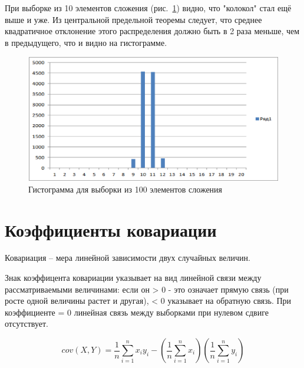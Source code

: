 \documentclass[a4paper,12pt]{article}
\begin{document}
\newpage
При выборке из 10 элементов сложения (рис.~\ref{fig:im_3}) видно, что "колокол" стал ещё выше и уже. Из центральной предельной теоремы следует, что среднее квадратичное отклонение этого распределения должно быть в 2 раза меньше, чем в предыдущего, что и видно на гистограмме.
\begin{center}
	\begin{figure}[h]
		\centering
   		\includegraphics[scale=0.3]{figure_3.png}
   		\caption{Гистограмма для выборки из 100 элементов сложения}
   		\label{fig:im_3}
    \end{figure}
\end{center}

\newpage\section{Коэффициенты ковариации}

Ковариация – мера линейной зависимости двух случайных величин.

Знак коэффицента ковариации указывает на вид линейной связи между рассматриваемыми величинами: если он > 0 - это означает прямую связь (при росте одной величины растет и другая), < 0 указывает на обратную связь. При коэффициенте = 0 линейная связь между выборками при нулевом сдвиге отсутствует.

{\large $$cov(X, Y) = \frac{1}{n}\sum\limits_{i=1}^n x_i y_i - \left(\frac{1}{n}\sum\limits_{i=1}^n x_i \right) \left( \frac{1}{n} \sum\limits_{i=1}^n y_i \right)$$}

\end{document}
